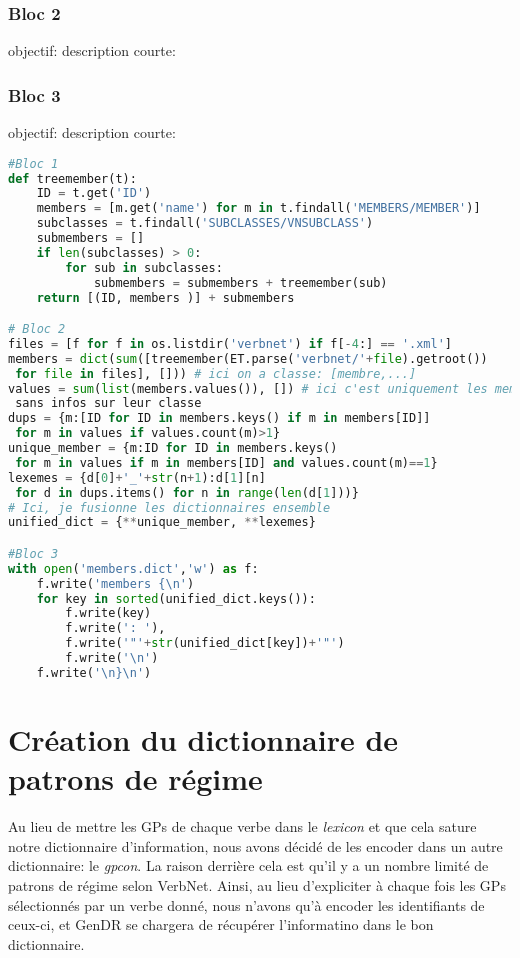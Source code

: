 \subsubsection{Bloc 2}
objectif:
description courte:

\subsubsection{Bloc 3}
objectif:
description courte:

\begin{lstlisting}[language=Python, caption = Ajout des membres de VerbNet, label=scriptmember]
#Bloc 1
def treemember(t):
    ID = t.get('ID')
    members = [m.get('name') for m in t.findall('MEMBERS/MEMBER')]
    subclasses = t.findall('SUBCLASSES/VNSUBCLASS')
    submembers = []
    if len(subclasses) > 0:
        for sub in subclasses:
            submembers = submembers + treemember(sub)
    return [(ID, members )] + submembers

# Bloc 2
files = [f for f in os.listdir('verbnet') if f[-4:] == '.xml']
members = dict(sum([treemember(ET.parse('verbnet/'+file).getroot())
 for file in files], [])) # ici on a classe: [membre,...]
values = sum(list(members.values()), []) # ici c'est uniquement les membres
 sans infos sur leur classe
dups = {m:[ID for ID in members.keys() if m in members[ID]]
 for m in values if values.count(m)>1}
unique_member = {m:ID for ID in members.keys()
 for m in values if m in members[ID] and values.count(m)==1}
lexemes = {d[0]+'_'+str(n+1):d[1][n]
 for d in dups.items() for n in range(len(d[1]))}
# Ici, je fusionne les dictionnaires ensemble
unified_dict = {**unique_member, **lexemes}

#Bloc 3
with open('members.dict','w') as f:
    f.write('members {\n')
    for key in sorted(unified_dict.keys()):
        f.write(key)
        f.write(': '),
        f.write('"'+str(unified_dict[key])+'"')
        f.write('\n')
    f.write('\n}\n')

\end{lstlisting}

\section{Création du dictionnaire de patrons de régime}

Au lieu de mettre les \acp{GP} de chaque verbe dans le \emph{lexicon} et que cela sature notre dictionnaire d'information, nous avons décidé de les encoder dans un autre dictionnaire: le \emph{gpcon}. La raison derrière cela est qu'il y a un nombre limité de patrons de régime selon VerbNet. Ainsi, au lieu d'expliciter à chaque fois les \acp{GP} sélectionnés par un verbe donné, nous n'avons qu'à encoder les identifiants de ceux-ci, et GenDR se chargera de récupérer l'informatino dans le bon dictionnaire. 

